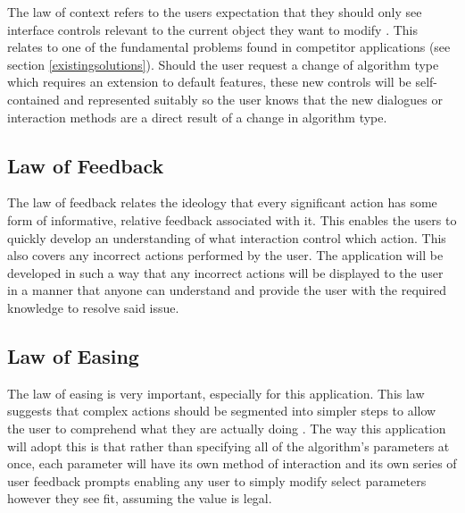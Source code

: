 The law of context refers to the users expectation that they should only see interface controls relevant to the current object they want to modify \cite{99designs:laws}. This relates to one of the fundamental problems found in competitor applications (see section \ref{existingsolutions}). Should the user request a change of algorithm type which requires an extension to default features, these new controls will be self-contained and represented suitably so the user knows that the new dialogues or interaction methods are a direct result of a change in algorithm type.

\subsection{Law of Feedback}

The law of feedback relates the ideology that every significant action has some form of informative, relative feedback associated with it\cite{99designs:laws}. This enables the users to quickly develop an understanding of what interaction control which action. This also covers any incorrect actions performed by the user. The application will be developed in such a way that any incorrect actions will be displayed to the user in a manner that anyone can understand and provide the user with the required knowledge to resolve said issue.

\subsection{Law of Easing}

The law of easing is very important, especially for this application. This law suggests that complex actions should be segmented into simpler steps to allow the user to comprehend what they are actually doing \cite{99designs:laws}. The way this application will adopt this is that rather than specifying all of the algorithm’s parameters at once, each parameter will have its own method of interaction and its own series of user feedback prompts enabling any user to simply modify select parameters however they see fit, assuming the value is legal.

